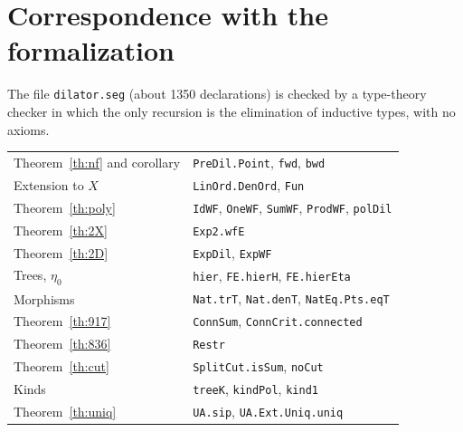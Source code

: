 \documentclass[11pt,a4paper]{article}
\theoremstyle{definition}
\theoremstyle{remark}
\begin{document}
\appendix
\section{Correspondence with the formalization}

The file \texttt{dilator.seg} (about 1350 declarations) is checked by a
type-theory checker in which the only recursion is the elimination of
inductive types, with no axioms.

\medskip
\begin{tabular}{ll}
Theorem~\ref{th:nf} and corollary & \texttt{PreDil.Point}, \texttt{fwd}, \texttt{bwd} \\
Extension to $X$ & \texttt{LinOrd.DenOrd}, \texttt{Fun} \\
Theorem~\ref{th:poly} & \texttt{IdWF}, \texttt{OneWF}, \texttt{SumWF}, \texttt{ProdWF}, \texttt{polDil} \\
Theorem~\ref{th:2X} & \texttt{Exp2.wfE} \\
Theorem~\ref{th:2D} & \texttt{ExpDil}, \texttt{ExpWF} \\
Trees, $\eta_0$ & \texttt{hier}, \texttt{FE.hierH}, \texttt{FE.hierEta} \\
Morphisms & \texttt{Nat.trT}, \texttt{Nat.denT}, \texttt{NatEq.Pts.eqT} \\
Theorem~\ref{th:917} & \texttt{ConnSum}, \texttt{ConnCrit.connected} \\
Theorem~\ref{th:836} & \texttt{Restr} \\
Theorem~\ref{th:cut} & \texttt{SplitCut.isSum}, \texttt{noCut} \\
Kinds & \texttt{treeK}, \texttt{kindPol}, \texttt{kind1} \\
Theorem~\ref{th:uniq} & \texttt{UA.sip}, \texttt{UA.Ext.Uniq.uniq}
\end{tabular}
\end{document}
